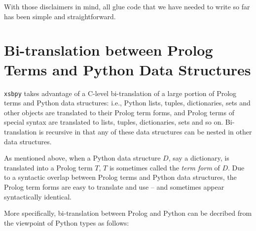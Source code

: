 With those disclaimers in mind, all glue code that we have needed to
write so far has been simple and straightforward.

\section{Bi-translation between Prolog Terms and Python Data Structures} \label{sec:bi-translation}

{\tt xsbpy} takes advantage of a C-level bi-translation of a large
portion of Prolog terms and Python data structures: i.e., Python
lists, tuples, dictionaries, sets and other objects are translated to
their Prolog term forms, and Prolog terms of special syntax are
translated to lists, tuples, dictionaries, sets and so on.
Bi-translation is recursive in that any of these data structures can
be nested in other data structures.
     
As mentioned above, when a Python data structure $D$, say a
dictionary, is translated into a Prolog term $T$, $T$ is sometimes
called the {\em term form} of $D$.  Due to a syntactic overlap between
Prolog terms and Python data structures, the Prolog term forms are
easy to translate and use -- and sometimes appear syntactically
identical.

More specifically, bi-translation between Prolog and Python can be
decribed from the viewpoint of Python types as follows: 

